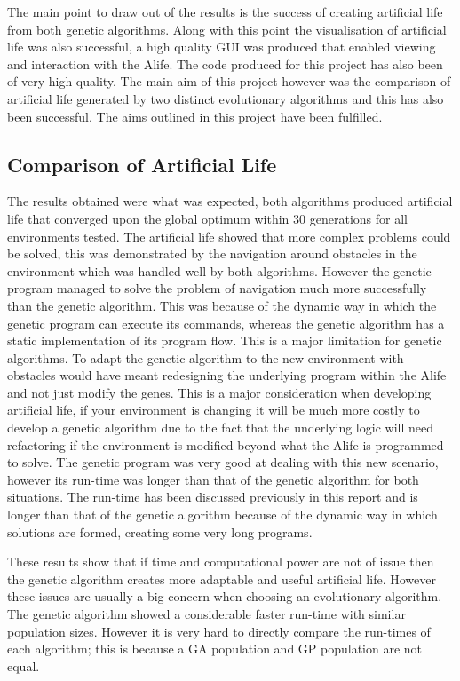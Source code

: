\documentclass[12pt]{article}
\begin{document}
The main point to draw out of the results is the success of creating artificial life from both genetic algorithms. Along with this point the 
visualisation of artificial life was also successful, a high quality GUI was produced that enabled viewing and interaction with the Alife.
The code produced for this project has also been of very high quality. The main aim of this project however was the comparison of artificial 
life generated by two distinct evolutionary algorithms and this has also been successful. The aims outlined in this project have been fulfilled.

\subsection{Comparison of Artificial Life}
The results obtained were what was expected, both algorithms produced artificial life that converged upon the global optimum within 30 generations
for all environments tested. The artificial life showed that more complex problems could be solved, this was demonstrated by the navigation around
obstacles in the environment which was handled well by both algorithms. However the genetic program managed to solve the problem of navigation much
more successfully than the genetic algorithm. This was because of the dynamic way in which the genetic program can execute its commands, whereas the genetic
algorithm has a static implementation of its program flow. This is a major limitation for genetic algorithms. To adapt the genetic algorithm to the
new environment with obstacles would have meant redesigning the underlying program within the Alife and not just modify the genes. This is a major 
consideration when developing artificial life, if your environment is changing it will be much more costly to develop a genetic algorithm due to the 
fact that the underlying logic will need refactoring if the environment is modified beyond what the Alife is programmed to solve. The genetic 
program was very good at dealing with this new scenario, however its run-time was longer than that of the genetic algorithm for both situations. The 
run-time has been discussed previously in this report and is longer than that of the genetic algorithm because of the dynamic way in which solutions
are formed, creating some very long programs. 

These results show that if time and computational power are not of issue then the genetic algorithm creates more adaptable and useful
artificial life. However these issues are usually a big concern when choosing an evolutionary algorithm. The genetic algorithm
showed a considerable faster run-time with similar population sizes. However it is very hard to directly compare the run-times of each algorithm;
this is because a GA population and GP population are not equal. 
\end{document}
